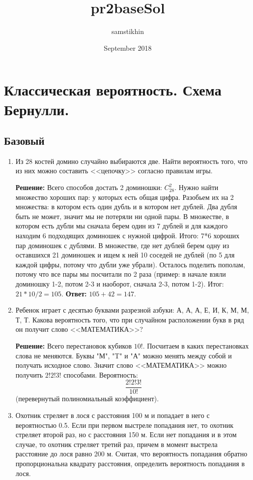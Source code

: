 \documentclass[a4paper, 14pt]{extarticle}
\title{pr2baseSol}
\author{samstikhin }
\date{September 2018}
\begin{document}
\section*{Классическая вероятность. Схема Бернулли.}
\subsection*{Базовый}
\begin{enumerate}
\item  Из 28 костей домино случайно выбираются две.
Найти вероятность  того, что из них можно 
составить <<цепочку>> согласно правилам игры.

\textbf{Решение:}
Всего способов достать 2 доминошки: $C_{28}^2$. Нужно найти множество хороших пар: у которых есть общая цифра. Разобьем их на 2 множества: в котором есть один дубль и в котором нет дублей. Два дубля быть не может, значит мы не потеряли ни одной пары. \newline
В множестве, в котором есть дубли мы сначала берем один из 7 дублей и для каждого находим 6 подходящих доминошек с нужной цифрой. Итого: 7*6 хороших пар доминошек с дублями.
\newline
В множестве, где нет дублей берем одну из оставшихся 21 доминошек и ищем к ней 10 соседей не дублей (по 5 для каждой цифры, потому что дубли уже убрали). Осталось поделить пополам, потому что все пары мы посчитали по 2 раза (пример: в начале взяли доминошку 1-2, потом 2-3 и наоборот, сначала 2-3, потом 1-2). Итог: $21*10/2=105$.
\textbf{Ответ:} $105+42 = 147$.

\item Ребенок играет с десятью буквами разрезной азбуки: А, А, А,
Е, И, К, М, М, Т, Т. Какова вероятность того, что при случайном
расположении букв в ряд он получит слово <<МАТЕМАТИКА>>?

\textbf{Решение:}
Всего перестановок кубиков $10!$. Посчитаем в каких перестановках слова не меняются. Буквы "М", "T" и "А" можно менять между собой и получать исходное слово. Значит слово <<МАТЕМАТИКА>> можно получить $2!2!3!$ способами. Вероятность: $$\frac{2!2!3!}{10!}$$ (перевернутый полиномиальный коэффициент).

\item Охотник стреляет в лося с расстояния 100 м и 
	попадает в него с вероятностью 0.5. Если при первом выстреле
	попадания нет, то охотник стреляет второй раз, но с 
	расстояния 150 м. Если нет попадания и в этом случае, то охотник
	стреляет третий раз, причем в момент выстрела расстояние до
	лося равно 200 м. Считая, что вероятность попадания 
	обратно пропорциональна квадрату расстояния, определить 
	вероятность попадания в лося.


\end{enumerate}
\end{document}
